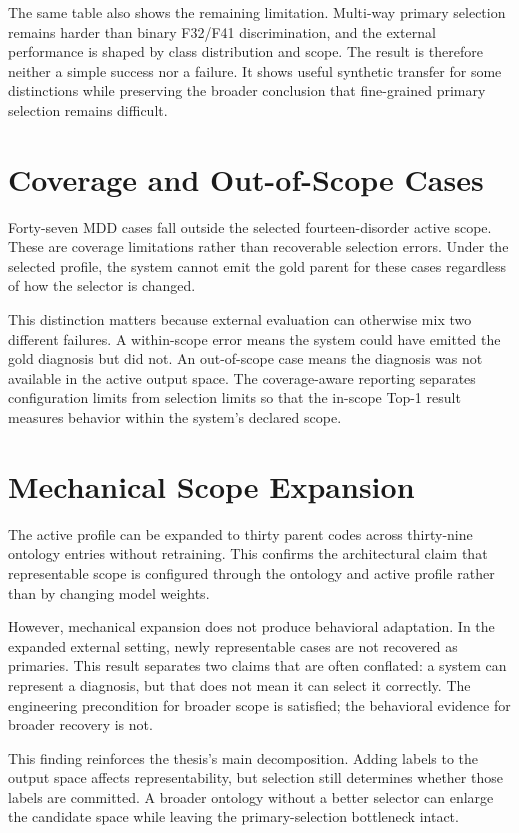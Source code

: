 The same table also shows the remaining limitation. Multi-way primary selection remains harder than binary F32/F41 discrimination, and the external performance is shaped by class distribution and scope. The result is therefore neither a simple success nor a failure. It shows useful synthetic transfer for some distinctions while preserving the broader conclusion that fine-grained primary selection remains difficult.

\section{Coverage and Out-of-Scope Cases}

Forty-seven MDD cases fall outside the selected fourteen-disorder active scope. These are coverage limitations rather than recoverable selection errors. Under the selected profile, the system cannot emit the gold parent for these cases regardless of how the selector is changed.

This distinction matters because external evaluation can otherwise mix two different failures. A within-scope error means the system could have emitted the gold diagnosis but did not. An out-of-scope case means the diagnosis was not available in the active output space. The coverage-aware reporting separates configuration limits from selection limits so that the in-scope Top-1 result measures behavior within the system's declared scope.

\section{Mechanical Scope Expansion}

The active profile can be expanded to thirty parent codes across thirty-nine ontology entries without retraining. This confirms the architectural claim that representable scope is configured through the ontology and active profile rather than by changing model weights.

However, mechanical expansion does not produce behavioral adaptation. In the expanded external setting, newly representable cases are not recovered as primaries. This result separates two claims that are often conflated: a system can represent a diagnosis, but that does not mean it can select it correctly. The engineering precondition for broader scope is satisfied; the behavioral evidence for broader recovery is not.

This finding reinforces the thesis's main decomposition. Adding labels to the output space affects representability, but selection still determines whether those labels are committed. A broader ontology without a better selector can enlarge the candidate space while leaving the primary-selection bottleneck intact.

